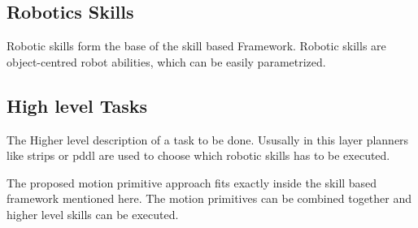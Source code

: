 \subsection{Robotics Skills}
Robotic skills form the base of the skill based Framework. Robotic skills are
object-centred robot abilities, which can be easily parametrized.
  

\subsection{High level Tasks}
The Higher level description of a task to be done. Ususally in this layer
planners like \acrfull{strips} or \acrfull{pddl} are used to choose which robotic skills has to be
executed.


The proposed motion primitive approach fits exactly inside the skill based 
framework mentioned here.
The motion primitives can be combined together and higher level skills
can be executed.

